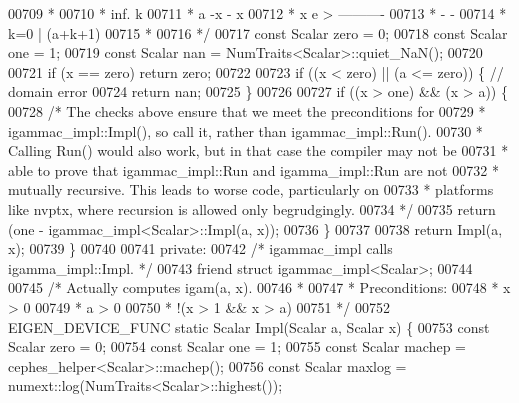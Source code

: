 \begin{DoxyCode}
00709 \textcolor{comment}{     *}
00710 \textcolor{comment}{     *          inf.      k}
00711 \textcolor{comment}{     *   a  -x   -       x}
00712 \textcolor{comment}{     *  x  e     >   ----------}
00713 \textcolor{comment}{     *           -     -}
00714 \textcolor{comment}{     *          k=0   | (a+k+1)}
00715 \textcolor{comment}{     *}
00716 \textcolor{comment}{     */}
00717     \textcolor{keyword}{const} Scalar zero = 0;
00718     \textcolor{keyword}{const} Scalar one = 1;
00719     \textcolor{keyword}{const} Scalar nan = NumTraits<Scalar>::quiet\_NaN();
00720 
00721     \textcolor{keywordflow}{if} (x == zero) \textcolor{keywordflow}{return} zero;
00722 
00723     \textcolor{keywordflow}{if} ((x < zero) || (a <= zero)) \{  \textcolor{comment}{// domain error}
00724       \textcolor{keywordflow}{return} nan;
00725     \}
00726 
00727     \textcolor{keywordflow}{if} ((x > one) && (x > a)) \{
00728       \textcolor{comment}{/* The checks above ensure that we meet the preconditions for}
00729 \textcolor{comment}{       * igammac\_impl::Impl(), so call it, rather than igammac\_impl::Run().}
00730 \textcolor{comment}{       * Calling Run() would also work, but in that case the compiler may not be}
00731 \textcolor{comment}{       * able to prove that igammac\_impl::Run and igamma\_impl::Run are not}
00732 \textcolor{comment}{       * mutually recursive.  This leads to worse code, particularly on}
00733 \textcolor{comment}{       * platforms like nvptx, where recursion is allowed only begrudgingly.}
00734 \textcolor{comment}{       */}
00735       \textcolor{keywordflow}{return} (one - igammac\_impl<Scalar>::Impl(a, x));
00736     \}
00737 
00738     \textcolor{keywordflow}{return} Impl(a, x);
00739   \}
00740 
00741  \textcolor{keyword}{private}:
00742   \textcolor{comment}{/* igammac\_impl calls igamma\_impl::Impl. */}
00743   \textcolor{keyword}{friend} \textcolor{keyword}{struct }igammac\_impl<Scalar>;
00744 
00745   \textcolor{comment}{/* Actually computes igam(a, x).}
00746 \textcolor{comment}{   *}
00747 \textcolor{comment}{   * Preconditions:}
00748 \textcolor{comment}{   *   x > 0}
00749 \textcolor{comment}{   *   a > 0}
00750 \textcolor{comment}{   *   !(x > 1 && x > a)}
00751 \textcolor{comment}{   */}
00752   EIGEN\_DEVICE\_FUNC \textcolor{keyword}{static} Scalar Impl(Scalar a, Scalar x) \{
00753     \textcolor{keyword}{const} Scalar zero = 0;
00754     \textcolor{keyword}{const} Scalar one = 1;
00755     \textcolor{keyword}{const} Scalar machep = cephes\_helper<Scalar>::machep();
00756     \textcolor{keyword}{const} Scalar maxlog = numext::log(NumTraits<Scalar>::highest());

\end{DoxyCode}
